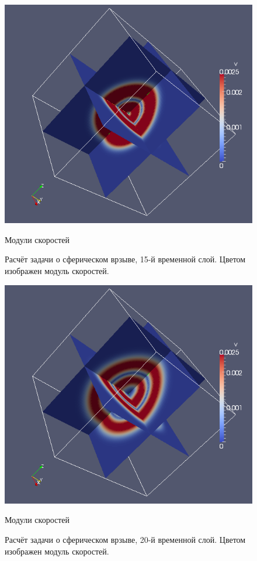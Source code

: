 \begin{figure}[htp]
\centering
\includegraphics[width=\textwidth]{png/spherical-explosion-test/v-scalar/0015.png}
\caption{Модули скоростей}
\caption{Расчёт задачи о сферическом врзыве, 15-й временной слой. Цветом изображен модуль скоростей.}
\end{figure}

\begin{figure}[htp]
\centering
\includegraphics[width=\textwidth]{png/spherical-explosion-test/v-scalar/0020.png}
\caption{Модули скоростей}
\caption{Расчёт задачи о сферическом врзыве, 20-й временной слой. Цветом изображен модуль скоростей.}
\end{figure}


